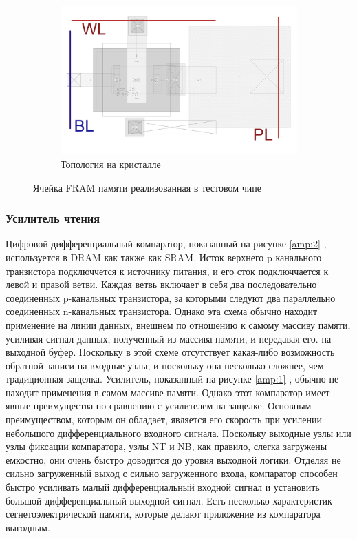 \documentclass[a4paper,12pt]{article} %
\begin{document}
\begin{figure}[H]
\begin{subfigure}[b]{0.8\textwidth}
    \includegraphics[width=\textwidth]{cell.png}
    \caption{Топология на кристалле}
    \label{pic:cell_la}
  \end{subfigure}
  \caption{Ячейка FRAM памяти реализованная в тестовом чипе}
\end{figure}




\subsubsection{Усилитель чтения} %
\label{subsec:amp}
Цифровой дифференциальный компаратор, показанный на рисунке \ref{amp:2} , используется в DRAM как
также как SRAM. Исток верхнего p канального транзистора подключчется  к источнику питания, и его сток подключчается к левой и правой ветви. Каждая ветвь включает в себя два последовательно соединенных p-канальных транзистора, за которыми следуют два параллельно соединенных n-канальных транзистора. Однако эта схема обычно находит применение на линии данных, внешнем по отношению к самому массиву памяти, усиливая сигнал данных, полученный из массива памяти, и передавая его.
на выходной буфер. Поскольку в этой схеме отсутствует какая-либо возможность обратной записи на входные узлы, и поскольку она несколько сложнее, чем традиционная защелка.
Усилитель, показанный на рисунке \ref{amp:1} , обычно не находит применения в самом массиве памяти. Однако этот компаратор имеет явные преимущества по сравнению с усилителем на защелке. Основным преимуществом, которым он обладает, является его скорость при усилении
небольшого дифференциального входного сигнала. Поскольку выходные узлы или узлы фиксации компаратора, узлы NT и NB, как правило, слегка загружены емкостно, они очень
быстро доводится до  уровня выходной логики. Отделяя не сильно
загруженный выход с сильно загруженного входа, компаратор способен быстро усиливать
малый дифференциальный входной сигнал и установить большой дифференциальный выходной сигнал.
Есть несколько характеристик сегнетоэлектрической памяти, которые делают приложение
из компаратора выгодным.
\end{document}
